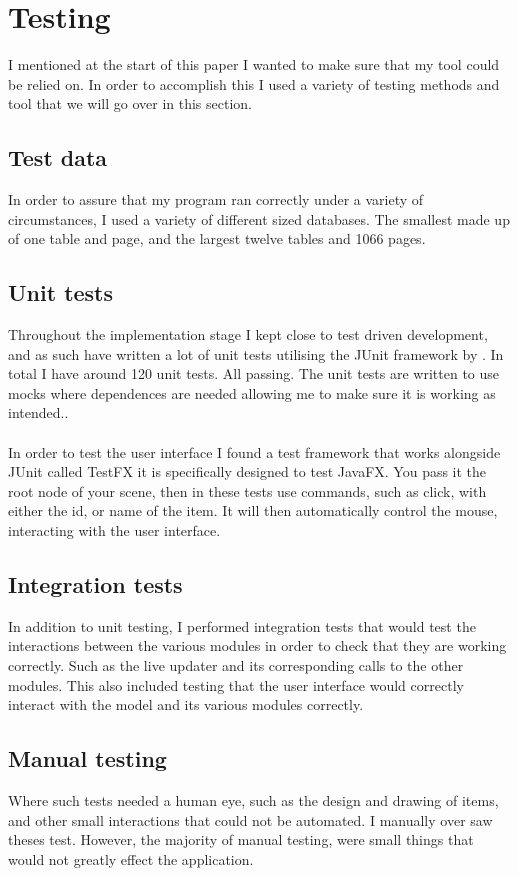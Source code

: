 \section{Testing}
\label{sec:testing}

 I mentioned at the start of this paper I wanted to make sure that my tool could be relied on. In order to accomplish this I used a variety of testing methods and tool that we will go over in this section.

\subsection{Test data}
\label{subsec:test_data}

In order to assure that my program ran correctly under a variety of circumstances, I used a variety of different sized databases. The smallest made up of one table and page, and the largest twelve tables and 1066 pages. 

\subsection{Unit tests}
\label{subsec:unit_tests}

Throughout the implementation stage I kept close to test driven development, and as such have written a lot of unit tests utilising the JUnit framework by \cite{junit} . In total I have around 120 unit tests. All passing. The unit tests are written to use mocks where dependences are needed allowing me to make sure it is working as intended..
\\\\
In order to test the user interface I found a test framework that works alongside JUnit called TestFX \citep{test_fx} it is specifically designed to test JavaFX. You pass it the root node of your scene, then in these tests use commands, such as click, with either the id, or name of the item. It will then automatically control the mouse, interacting with the user interface.

\subsection{Integration tests}
\label{subsec:integration_tests}

In addition to unit testing, I performed integration tests that would test the interactions between the various modules in order to check that they are working correctly. Such as the live updater and its corresponding calls to the other modules. This also included testing that the user interface would correctly interact with the model and its various modules correctly.

\subsection{Manual testing}
\label{subsec:mamual_tests}

Where such tests needed a human eye, such as the design and drawing of items, and other small interactions that could not be automated. I manually over saw theses test. However, the majority of manual testing, were small things that would not greatly effect the application.
